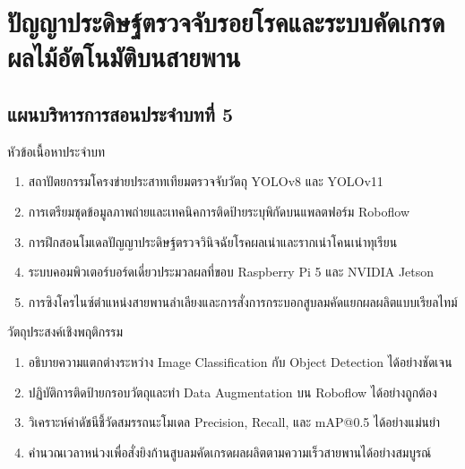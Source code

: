\chapter{ปัญญาประดิษฐ์ตรวจจับรอยโรคและระบบคัดเกรดผลไม้อัตโนมัติบนสายพาน}
\label{chap:ch05}

\section*{แผนบริหารการสอนประจำบทที่ 5}

\begin{planbox}{หัวข้อเนื้อหาประจำบท}
\begin{enumerate}[topsep=2pt, itemsep=1pt, partopsep=0pt, parsep=0pt, leftmargin=1.5em]
    \item สถาปัตยกรรมโครงข่ายประสาทเทียมตรวจจับวัตถุ YOLOv8 และ YOLOv11
    \item การเตรียมชุดข้อมูลภาพถ่ายและเทคนิคการติดป้ายระบุพิกัดบนแพลตฟอร์ม Roboflow
    \item การฝึกสอนโมเดลปัญญาประดิษฐ์ตรวจวินิจฉัยโรคผลเน่าและรากเน่าโคนเน่าทุเรียน
    \item ระบบคอมพิวเตอร์บอร์ดเดี่ยวประมวลผลที่ขอบ Raspberry Pi 5 และ NVIDIA Jetson
    \item การซิงโครไนซ์ตำแหน่งสายพานลำเลียงและการสั่งการกระบอกสูบลมคัดแยกผลผลิตแบบเรียลไทม์
\end{enumerate}
\end{planbox}

\begin{planbox}{วัตถุประสงค์เชิงพฤติกรรม}
\begin{enumerate}[topsep=2pt, itemsep=1pt, partopsep=0pt, parsep=0pt, leftmargin=1.5em]
    \item อธิบายความแตกต่างระหว่าง Image Classification กับ Object Detection ได้อย่างชัดเจน
    \item ปฏิบัติการติดป้ายกรอบวัตถุและทำ Data Augmentation บน Roboflow ได้อย่างถูกต้อง
    \item วิเคราะห์ค่าดัชนีชี้วัดสมรรถนะโมเดล Precision, Recall, และ mAP@0.5 ได้อย่างแม่นยำ
    \item คำนวณเวลาหน่วงเพื่อสั่งยิงก้านสูบลมคัดเกรดผลผลิตตามความเร็วสายพานได้อย่างสมบูรณ์
\end{enumerate}
\end{planbox}

\newpage

